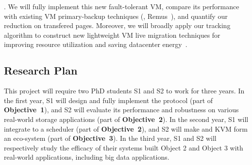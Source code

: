 
. We will fully implement this new fault-tolerant VM, 
compare its performance with existing VM primary-backup techniques (\eg, 
Remus~\cite{remus:nsdi08}), and quantify our reduction on transfered pages. 
Moreover, we will broadly apply our tracking algorithm to construct new 
lightweight VM live migration techniques for improving resource utilization and 
saving datacenter energy~\cite{vmotion:atc05}.


% 

\vspace{-.15in}\subsection{Research Plan} \label{sec:plan}\vspace{-.075in}

This project will require two PhD students S1 and S2 to work for 
three years. In the first year, S1 will design and fully implement the \falcon 
protocol (part of \textbf{Objective~1}), and S2 will evaluate its performance 
and robustness on various real-world storage applications (part of 
\textbf{Objective~2}). In the second year, S1 will 
integrate \falcon to a scheduler \mesos (part of \textbf{Objective~2}), and S2 
will make \falcon and KVM form an eco-system (part of \textbf{Objective~3}). In 
the third year, S1 and S2 will respectively study the efficacy of their systems 
built Object 2 and Object 3 with real-world applications, including big data 
applications.


